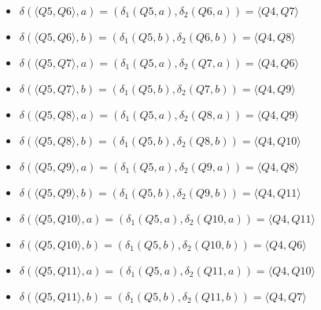 \documentclass[12pt, a4paper]{article}
\begin{document}
\begin{enumerate}
\begin{itemize}
\begin{itemize}
        \item \(\delta(\langle Q5,Q6 \rangle,a)=(\delta_1(Q5,a),\delta_2(Q6,a))=\langle Q4,Q7 \rangle\)
        \item \(\delta(\langle Q5,Q6 \rangle,b)=(\delta_1(Q5,b),\delta_2(Q6,b))=\langle Q4,Q8 \rangle\)
        \item \(\delta(\langle Q5,Q7 \rangle,a)=(\delta_1(Q5,a),\delta_2(Q7,a))=\langle Q4,Q6 \rangle\)
        \item \(\delta(\langle Q5,Q7 \rangle,b)=(\delta_1(Q5,b),\delta_2(Q7,b))=\langle Q4,Q9 \rangle\)
        \item \(\delta(\langle Q5,Q8 \rangle,a)=(\delta_1(Q5,a),\delta_2(Q8,a))=\langle Q4,Q9 \rangle\)
        \item \(\delta(\langle Q5,Q8 \rangle,b)=(\delta_1(Q5,b),\delta_2(Q8,b))=\langle Q4,Q10 \rangle\)
        \item \(\delta(\langle Q5,Q9 \rangle,a)=(\delta_1(Q5,a),\delta_2(Q9,a))=\langle Q4,Q8 \rangle\)
        \item \(\delta(\langle Q5,Q9 \rangle,b)=(\delta_1(Q5,b),\delta_2(Q9,b))=\langle Q4,Q11 \rangle\)
        \item \(\delta(\langle Q5,Q10 \rangle,a)=(\delta_1(Q5,a),\delta_2(Q10,a))=\langle Q4,Q11 \rangle\)
        \item \(\delta(\langle Q5,Q10 \rangle,b)=(\delta_1(Q5,b),\delta_2(Q10,b))=\langle Q4,Q6 \rangle\)
        \item \(\delta(\langle Q5,Q11 \rangle,a)=(\delta_1(Q5,a),\delta_2(Q11,a))=\langle Q4,Q10 \rangle\)
        \item \(\delta(\langle Q5,Q11 \rangle,b)=(\delta_1(Q5,b),\delta_2(Q11,b))=\langle Q4,Q7 \rangle\)
    \end{itemize}
\end{itemize}

\begin{comment}
digraph {
    rankdir="LR"
    "" [shape=point]
    Q1Q6 [shape=circle]
    Q2Q7 [shape=circle]
    Q2Q8 [shape=circle]
    Q1Q7 [shape=circle]
    Q2Q6 [shape=circle]
    Q2Q9 [shape=circle]
    Q1Q8 [shape=circle]
    Q2Q10 [shape=circle]
    Q1Q9 [shape=circle]
    Q2Q11 [shape=circle]
    Q1Q10 [shape=circle]
    Q1Q11 [shape=circle]
    Q3Q7 [shape=circle]
    Q3Q8 [shape=circle]
    Q3Q6 [shape=circle]
    Q3Q9 [shape=circle]
    Q3Q10 [shape=circle]
    Q3Q11 [shape=circle]
    Q4Q7 [shape=doublecircle]
    Q4Q8 [shape=doublecircle]
    Q4Q6 [shape=circle]
    Q4Q9 [shape=doublecircle]
    Q4Q10 [shape=circle]
    Q4Q11 [shape=doublecircle]
    Q5Q7 [shape=circle]
    Q5Q8 [shape=circle]
    Q5Q6 [shape=circle]
    Q5Q9 [shape=circle]
    Q5Q10 [shape=circle]
    Q5Q11 [shape=circle]
    

\end{comment}
\end{enumerate}
\end{document}
